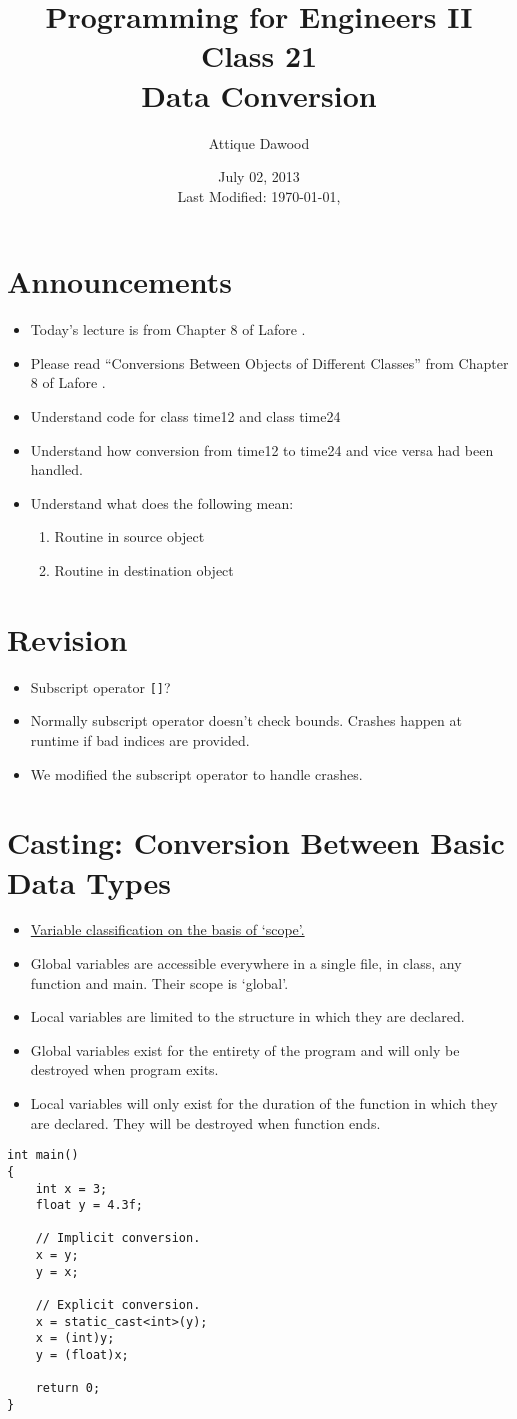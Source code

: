 \documentclass[12pt,a4paper]{article}
\title{\vspace{-2cm}Programming for Engineers II\\Class 21\\Data Conversion}
\author{Attique Dawood}
\date{July 02, 2013\\[0.2cm] Last Modified: \today, \currenttime}
\begin{document}
\maketitle
\section{Announcements}
\begin{itemize}
\item Today's lecture is from Chapter 8 of Lafore \cite{Lafore}.
\item Please read ``Conversions Between Objects of Different Classes'' from Chapter 8 of Lafore \cite{Lafore}.
\item Understand code for class time12 and class time24
\item Understand how conversion from time12 to time24 and vice versa had been handled.
\item Understand what does the following mean:
\begin{enumerate}
\item Routine in source object
\item Routine in destination object
\end{enumerate}
\end{itemize}
\section{Revision}
\begin{itemize}
\item Subscript operator \verb|[]|?
\item Normally subscript operator doesn't check bounds. Crashes happen at runtime if bad indices are provided.
\item We modified the subscript operator to handle crashes.
\end{itemize}
\section{Casting: Conversion Between Basic Data Types}
\begin{itemize}
\item \underline{Variable classification on the basis of `scope'.}
\item Global variables are accessible everywhere in a single file, in class, any function and main. Their scope is `global'.
\item Local variables are limited to the structure in which they are declared.
\item Global variables exist for the entirety of the program and will only be destroyed when program exits.
\item Local variables will only exist for the duration of the function in which they are declared. They will be destroyed when function ends.
\end{itemize}
\begin{lstlisting}[caption={Variable Casting}]
int main()
{
	int x = 3;
	float y = 4.3f;

	// Implicit conversion.
	x = y;
	y = x;

	// Explicit conversion.
	x = static_cast<int>(y);
	x = (int)y;
	y = (float)x;
	
	return 0;
}
\end{lstlisting}
\end{document}
